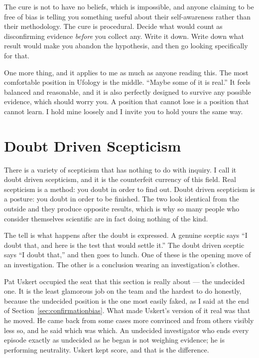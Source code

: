 The cure is not to have no beliefs, which is impossible, and anyone claiming to be
free of bias is telling you something useful about their self-awareness rather than
their methodology. The cure is procedural. Decide what would count as disconfirming
evidence \emph{before} you collect any. Write it down. Write down what result would
make you abandon the hypothesis, and then go looking specifically for that. 

One more thing, and it applies to me as much as anyone reading this. The most
comfortable position in Ufology is the middle. ``Maybe some of it is real.'' It
feels balanced and reasonable, and it is also perfectly designed to survive any
possible evidence, which should worry you. A position that cannot lose is a position
that cannot learn. I hold mine loosely and I invite you to hold yours the same way.

\section{Doubt Driven Scepticism}\label{sec:doubtdrivenskepticism}

There is a variety of scepticism that has nothing to do with inquiry. I call it
doubt driven scepticism, and it is the counterfeit currency of this field. Real
scepticism is a method: you doubt in order to find out. Doubt driven scepticism is a
posture: you doubt in order to be finished. The two look identical from the outside
and they produce opposite results, which is why so many people who consider
themselves scientific are in fact doing nothing of the kind.

The tell is what happens after the doubt is expressed. A genuine sceptic says ``I
doubt that, and here is the test that would settle it.'' The doubt driven sceptic
says ``I doubt that,'' and then goes to lunch. One of these is the opening move of an
investigation. The other is a conclusion wearing an investigation's clothes.

Pat Uskert occupied the seat that this section is really about --- the undecided one. It is the
least glamorous job on the team and the hardest to do honestly, because the undecided position is
the one most easily faked, as I said at the end of Section~\ref{sec:confirmationbias}. What made
Uskert's version of it real was that he moved. He
came back from some cases more convinced and from others visibly less so, and he said which was
which. An undecided investigator who ends every episode exactly as undecided as he began is not
weighing evidence; he is performing neutrality. Uskert kept score, and that is the difference.

